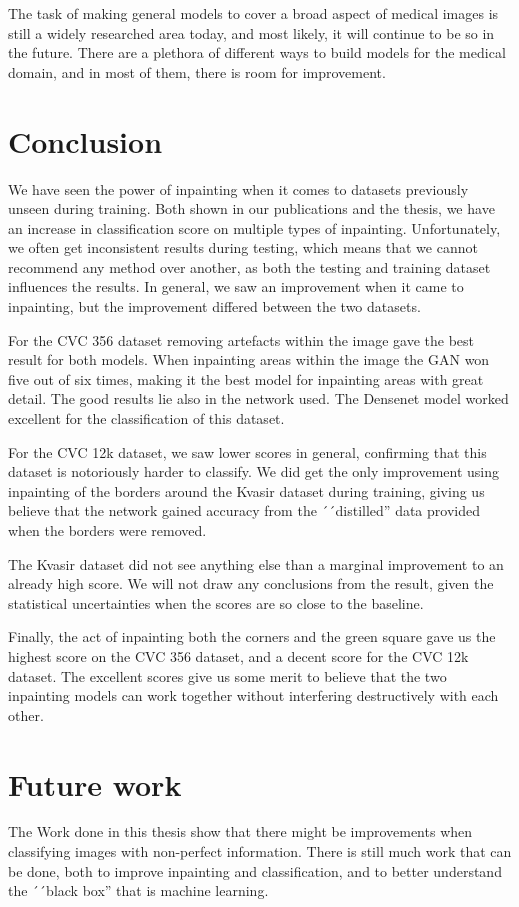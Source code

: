 The task of making general models to cover a broad aspect of medical images is still a widely researched area today, and most likely, it will continue to be so in the future. There are a  plethora of different ways to build models for the medical domain, and in most of them, there is room for improvement.

\section{Conclusion}
We have seen the power of inpainting when it comes to datasets previously unseen during training. Both shown in our publications and the thesis, we have an increase in classification score on multiple types of inpainting.
Unfortunately, we often get inconsistent results during testing, which means that we cannot recommend any method over another, as both the testing and training dataset influences the results.
In general, we saw an improvement when it came to inpainting, but the improvement differed between the two datasets. 

For the CVC 356 dataset removing artefacts within the image gave the best result for both models. When inpainting areas within the image the GAN won five out of six times, making it the best model for inpainting  areas with great detail. The good results lie also in the network used. The Densenet model worked excellent for the classification of this dataset.


For the CVC 12k dataset, we saw lower scores in general, confirming that this dataset is notoriously harder to classify. We did get the only improvement using inpainting of the borders around the Kvasir dataset during training, giving us believe that the network gained accuracy from the ´´distilled'' data provided when the borders were removed. 

The Kvasir dataset did not see anything else than a marginal improvement to an already high score. We will not draw any conclusions from the result, given the statistical uncertainties when the scores are so close to the baseline.


Finally, the act of inpainting both the corners and the green square gave us the highest score on the CVC 356 dataset, and a decent score for the CVC 12k dataset. The excellent scores give us some merit to believe that the two inpainting models can work together without interfering destructively with each other. 



\section{Future work}
The Work done in this thesis show that there might be improvements when classifying images with non-perfect information. There is still much work that can be done, both to improve inpainting and classification, and to better understand the ´´black box'' that is machine learning. 


